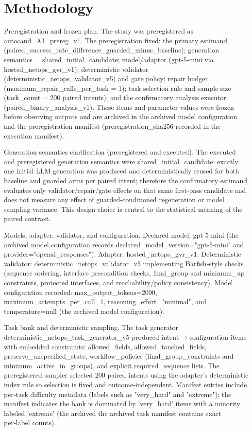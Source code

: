 \documentclass[conference]{IEEEtran}
\begin{document}
\section{Methodology}
Preregistration and frozen plan. The study was preregistered as autocand\_A1\_prereg\_v1. The preregistration fixed: the primary estimand (paired\_success\_rate\_difference\_guarded\_minus\_baseline); generation semantics = shared\_initial\_candidate; model/adaptor (gpt‑5‑mini via hosted\_netops\_gvr\_v1); deterministic validator (deterministic\_netops\_validator\_v5) and gate policy; repair budget (maximum\_repair\_calls\_per\_task = 1); task selection rule and sample size (task\_count = 200 paired intents); and the confirmatory analysis executor (paired\_binary\_analysis\_v1). These items and parameter values were frozen before observing outputs and are archived in the archived model configuration and the preregistration manifest (preregistration\_sha256 recorded in the execution manifest).

Generation semantics clarification (preregistered and executed). The executed and preregistered generation semantics were shared\_initial\_candidate: exactly one initial LLM generation was produced and deterministically reused for both baseline and guarded arms per paired intent; therefore the confirmatory estimand evaluates only validator/repair/gate effects on that same first‑pass candidate and does not measure any effect of guarded‑conditioned regeneration or model sampling variance. This design choice is central to the statistical meaning of the paired contrast.

Models, adapter, validator, and configuration. Declared model: gpt‑5‑mini (the archived model configuration records declared\_model\_version="gpt-5-mini" and provider="openai\_responses"). Adapter: hosted\_netops\_gvr\_v1. Deterministic validator: deterministic\_netops\_validator\_v5 implementing Batfish‑style checks (sequence ordering, interface precondition checks, final\_group and minimum\_up constraints, protected interfaces, and reachability/policy consistency). Model configuration recorded: max\_output\_tokens=2000, maximum\_attempts\_per\_call=1, reasoning\_effort="minimal", and temperature=null (the archived model configuration).

Task bank and deterministic sampling. The task generator deterministic\_netops\_task\_generator\_v5 produced intent\ensuremath{\rightarrow}configuration items with embedded constraints: allowed\_fields, allowed\_touched\_fields, preserve\_unspecified\_state, workflow\_policies (final\_group\_constraints and minimum\_active\_in\_groups), and explicit required\_sequence lists. The preregistered sampler selected 200 paired intents using the adapter's deterministic index rule so selection is fixed and outcome‑independent. Manifest entries include per‑task difficulty metadata (labels such as "very\_hard" and "extreme"); the manifest indicates the bank is dominated by 'very\_hard' items with a minority labeled 'extreme' (the archived the archived task manifest contains exact per‑label counts).
\end{document}
